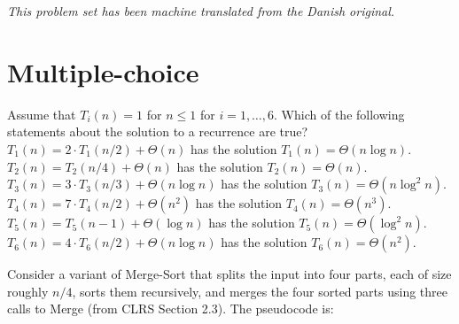 \noindent\emph{This problem set has been machine translated from the Danish original.}
\medskip

\section*{Multiple-choice}\label{sec:mc}


\multiplechoicestart

Assume that $T_i(n)=1$ for $n \leq 1$ for $i=1,\dots,6$. Which of the following statements about the solution to a recurrence are true?
\multipleanswers
\optionsstart
\answer $T_1(n) = 2\cdot T_1(n/2) + \Theta(n)$ has the solution $T_1(n) = \Theta(n \log n)$. \correct
\answer $T_2(n) = T_2(n/4) + \Theta(n)$ has the solution $T_2(n) = \Theta(n)$. \correct
\answer $T_3(n) = 3\cdot T_3(n/3) + \Theta(n \log n)$ has the solution $T_3(n) = \Theta(n \log^2 n)$. \correct
\answer $T_4(n) = 7\cdot T_4(n/2) + \Theta(n^2)$ has the solution $T_4(n) = \Theta(n^3)$.
\answer $T_5(n) = T_5(n-1) + \Theta(\log n)$ has the solution $T_5(n) = \Theta(\log^2 n)$.
\answer $T_6(n) = 4\cdot T_6(n/2) + \Theta(n \log n)$ has the solution $T_6(n) = \Theta(n^2)$. \correct
\optionsend



Consider a variant of {\sc Merge-Sort} that splits the input into four parts, each of size roughly $n/4$, sorts them recursively, and merges the four sorted parts using three calls to {\sc Merge} (from CLRS Section 2.3). The pseudocode is:

